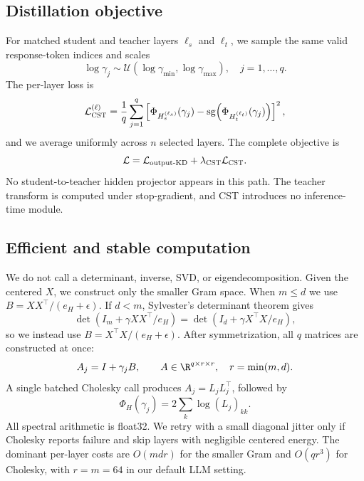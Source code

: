 \documentclass{article}
\newcommand{\cst}{\textsc{CST}}
\newcommand{\sg}{\operatorname{sg}}
\begin{document}
\subsection{Distillation objective}

For matched student and teacher layers $\ell_s$ and $\ell_t$, we sample the
same valid response-token indices and scales
\begin{equation}
 \log\gamma_j\sim
 \mathcal U(\log\gamma_{\min},\log\gamma_{\max}),
 \quad j=1,\ldots,q.
\end{equation}
The per-layer loss is
\begin{equation}
 \mathcal L_{\cst}^{(\ell)}=
 \frac{1}{q}\sum_{j=1}^{q}
 \left[
   \Phi_{H_s^{(\ell_s)}}(\gamma_j)
   -\sg\!\left(\Phi_{H_t^{(\ell_t)}}(\gamma_j)\right)
 \right]^2,
\end{equation}
and we average uniformly across $n$ selected layers.  The complete objective is
\begin{equation}
 \mathcal L=\mathcal L_{\mathrm{output\text{-}KD}}
 +\lambda_{\cst}\mathcal L_{\cst}.
 \label{eq:total}
\end{equation}
No student-to-teacher hidden projector appears in this path.  The teacher
transform is computed under stop-gradient, and \cst{} introduces no
inference-time module.

\subsection{Efficient and stable computation}

We do not call a determinant, inverse, SVD, or eigendecomposition.  Given the
centered $X$, we construct only the smaller Gram space.  When $m\leq d$ we use
$B=XX^\top/(e_H+\epsilon)$.  If $d<m$, Sylvester's determinant theorem gives
\begin{equation}
 \det(I_m+\gamma XX^\top/e_H)
 =\det(I_d+\gamma X^\top X/e_H),
\end{equation}
so we instead use $B=X^\top X/(e_H+\epsilon)$.  After symmetrization, all
$q$ matrices are constructed at once:
\begin{equation}
 A_j=I+\gamma_jB,\qquad
 A\in\R^{q\times r\times r},\quad r=\min(m,d).
\end{equation}
A single batched Cholesky call produces $A_j=L_jL_j^\top$, followed by
\begin{equation}
 \Phi_H(\gamma_j)=2\sum_k\log (L_j)_{kk}.
\end{equation}
All spectral arithmetic is float32.  We retry with a small diagonal jitter
only if Cholesky reports failure and skip layers with negligible centered
energy.  The dominant per-layer costs are $O(md r)$ for the smaller Gram and
$O(qr^3)$ for Cholesky, with $r=m=64$ in our default LLM setting.
\end{document}
